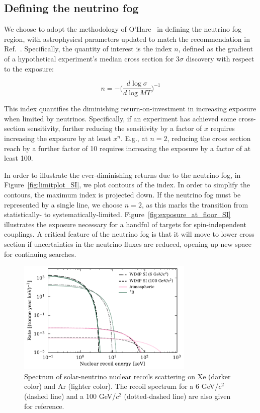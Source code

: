 \subsection*{Defining the neutrino fog}

We choose to adopt the methodology of O'Hare~\cite{OHare:2021utq} in defining the neutrino fog region, with astrophysicsl parameters updated to match the recommendation in Ref.~\cite{recommendation_dark_matter}. Specifically, the quantity of interest is the index $n$, defined as the gradient of a hypothetical experiment's median cross section for $3\sigma$ discovery with respect to the exposure:

\begin{equation}
    n = -\bigg( \frac{d \log{\sigma}}{d \log{MT}} \bigg)^{-1}
\end{equation}

This index quantifies the diminishing return-on-investment in increasing exposure when limited by neutrinos. Specifically, if an experiment has achieved some cross-section sensitivity, further reducing the sensitivity by a factor of $x$ requires increasing the exposure by at least $x^n$. E.g., at $n=2$, reducing the cross section reach by a further factor of 10 requires increasing the exposure by a factor of at least 100. 

In order to illustrate the ever-diminishing returns due to the neutrino fog, in Figure~\ref{fig:limitplot_SI}, we plot contours of the index. In order to simplify the contours, the maximum index is projected down.  If the neutrino fog must be represented by a single line, we choose $n=2$, as this marks the transition from statistically- to systematically-limited. Figure~\ref{fig:exposure_at_floor_SI} illustrates the exposure necessary for a handful of targets for spin-independent couplings. A critical feature of the neutrino fog is that it will move to lower cross section if uncertainties in the neutrino fluxes are reduced, opening up new space for continuing searches. 

\begin{figure}
    \centering
    \includegraphics[width=0.75\textwidth]{figures/nu_rates_coherent_combined.pdf}
    \caption{Spectrum of solar-neutrino nuclear recoils scattering on Xe (darker color) and Ar (lighter color). The recoil spectrum for a 6 GeV/$c^2$ (dashed line) and a 100 GeV/$c^2$ (dotted-dashed line) are also given for reference.}
    \label{fig:coherent_solarnu_rates}
\end{figure}

